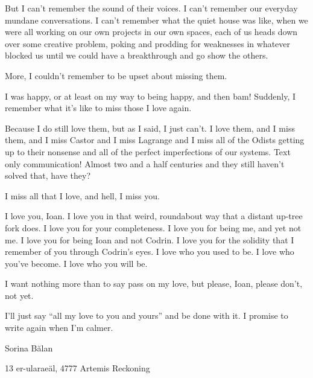 But I can't remember the sound of their voices. I can't remember our everyday mundane conversations. I can't remember what the quiet house was like, when we were all working on our own projects in our own spaces, each of us heads down over some creative problem, poking and prodding for weaknesses in whatever blocked us until we could have a breakthrough and go show the others.

More, I couldn't remember to be upset about missing them.

I was happy, or at least on my way to being happy, and then bam! Suddenly, I remember what it's like to miss those I love again.

Because I do still love them, but as I said, I just can't. I love them, and I miss them, and I miss Castor and I miss Lagrange and I miss all of the Odists getting up to their nonsense and all of the perfect imperfections of our systems. Text only communication! Almost two and a half centuries and they still haven't solved that, have they?

I miss all that I love, and hell, I miss you.

I love you, Ioan. I love you in that weird, roundabout way that a distant up-tree fork does. I love you for your completeness. I love you for being me, and yet not me. I love you for being Ioan and not Codrin. I love you for the solidity that I remember of you through Codrin's eyes. I love who you used to be. I love who you've become. I love who you will be.

I want nothing more than to say pass on my love, but please, Ioan, please don't, not yet.

I'll just say ``all my love to you and yours'' and be done with it. I promise to write again when I'm calmer.

Sorina Bălan

13 er-ularaeäl, 4777 Artemis Reckoning
